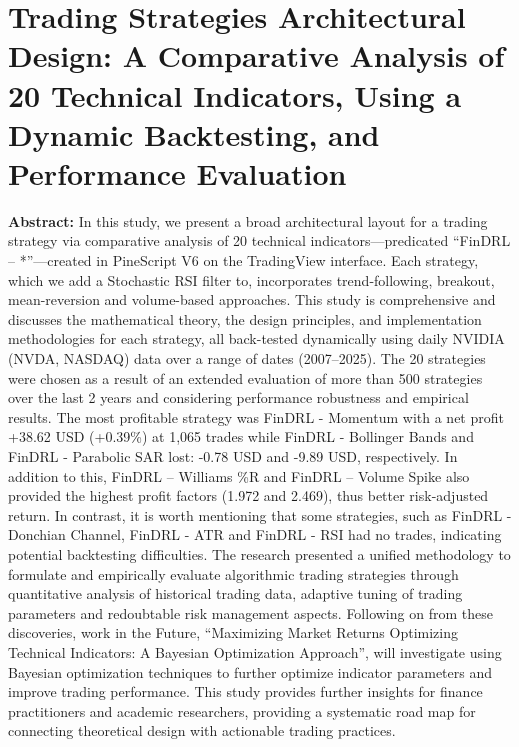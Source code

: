 \chapter{Trading Strategies Architectural Design: A Comparative Analysis of 20 Technical Indicators, Using a Dynamic Backtesting, and Performance Evaluation}

\textbf{Abstract: } 
In this study, we present a broad architectural layout for a trading strategy via comparative analysis of 20 technical indicators—predicated “FinDRL – *”—created in PineScript V6 on the TradingView interface. Each strategy, which we add a Stochastic RSI filter to, incorporates trend-following, breakout, mean-reversion and volume-based approaches. This study is comprehensive and discusses the mathematical theory, the design principles, and implementation methodologies for each strategy, all back-tested dynamically using daily NVIDIA (NVDA, NASDAQ) data over a range of dates (2007–2025).
The 20 strategies were chosen as a result of an extended evaluation of more than 500 strategies over the last 2 years and considering performance robustness and empirical results. The most profitable strategy was FinDRL - Momentum with a net profit +38.62 USD (+0.39\%) at 1,065 trades while FinDRL - Bollinger Bands and FinDRL - Parabolic SAR lost: -0.78 USD and -9.89 USD, respectively. In addition to this, FinDRL – Williams \%R and FinDRL – Volume Spike also provided the highest profit factors (1.972 and 2.469), thus better risk-adjusted return. In contrast, it is worth mentioning that some strategies, such as FinDRL - Donchian Channel, FinDRL - ATR and FinDRL - RSI had no trades, indicating potential backtesting difficulties.
The research presented a unified methodology to formulate and empirically evaluate algorithmic trading strategies through quantitative analysis of historical trading data, adaptive tuning of trading parameters and redoubtable risk management aspects. Following on from these discoveries, work in the Future, “Maximizing Market Returns Optimizing Technical Indicators: A Bayesian Optimization Approach”, will investigate using Bayesian optimization techniques to further optimize indicator parameters and improve trading performance. This study provides further insights for finance practitioners and academic researchers, providing a systematic road map for connecting theoretical design with actionable trading practices.

